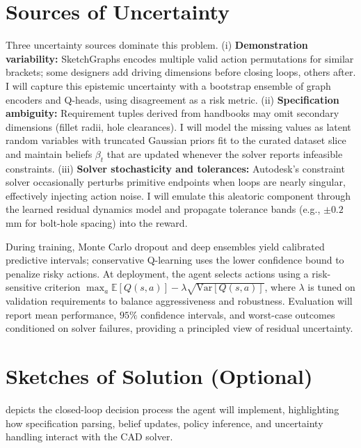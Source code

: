 \documentclass[twoside,11pt]{article}
\begin{document}
\section{Sources of Uncertainty}
Three uncertainty sources dominate this problem. (i) \textbf{Demonstration variability:} SketchGraphs encodes multiple valid action permutations for similar brackets; some designers add driving dimensions before closing loops, others after. I will capture this epistemic uncertainty with a bootstrap ensemble of graph encoders and Q-heads, using disagreement as a risk metric. (ii) \textbf{Specification ambiguity:} Requirement tuples derived from handbooks may omit secondary dimensions (fillet radii, hole clearances). I will model the missing values as latent random variables with truncated Gaussian priors fit to the curated dataset slice and maintain beliefs $\beta_t$ that are updated whenever the solver reports infeasible constraints. (iii) \textbf{Solver stochasticity and tolerances:} Autodesk's constraint solver occasionally perturbs primitive endpoints when loops are nearly singular, effectively injecting action noise. I will emulate this aleatoric component through the learned residual dynamics model and propagate tolerance bands (e.g., $\pm 0.2$ mm for bolt-hole spacing) into the reward.

During training, Monte Carlo dropout and deep ensembles yield calibrated predictive intervals; conservative Q-learning uses the lower confidence bound to penalize risky actions. At deployment, the agent selects actions using a risk-sensitive criterion $\max_a \mathbb{E}[Q(s,a)] - \lambda \sqrt{\text{Var}[Q(s,a)]}$, where $\lambda$ is tuned on validation requirements to balance aggressiveness and robustness. Evaluation will report mean performance, $95\%$ confidence intervals, and worst-case outcomes conditioned on solver failures, providing a principled view of residual uncertainty.

\section{Sketches of Solution (Optional)}
 depicts the closed-loop decision process the agent will implement, highlighting how specification parsing, belief updates, policy inference, and uncertainty handling interact with the CAD solver.
\end{document}
